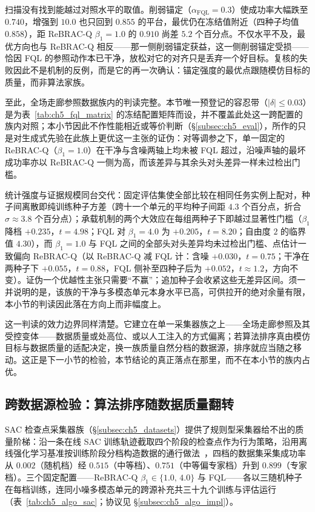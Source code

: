 扫描没有找到能越过对照水平的取值。削弱锚定（$\alpha_{\mathrm{FQL}}=0.3$）使成功率大幅跌至 $0.740$，增强到 $10.0$ 也只回到 $0.855$ 的平台，最优仍在冻结值附近（四种子均值 $0.858$），距 ReBRAC-Q $\beta_1=1.0$ 的 $0.910$ 尚差 $5.2$ 个百分点。不仅水平不及，最优方向也与 ReBRAC-Q 相反——那一侧削弱锚定获益，这一侧削弱锚定受损——恰因 FQL 的参照动作本已干净，放松对它的对齐只是丢弃一个好目标。复核的失败因此不是机制的反例，而是它的再一次确认：锚定强度的最优点跟随模仿目标的质量，而非算法家族。

至此，全场走廊参照数据族内的判读完整。本节唯一预登记的容忍带（$|\delta|\le 0.03$）是为表~\ref{tab:ch5_fql_matrix} 的冻结配置矩阵而设，并不覆盖此处这一跨配置的族内对照；本小节因此不作性能相近或等价判断（\S\ref{subsec:ch5_eval}），所作的只是对生成式先验在此族上更优这一主张的证伪：对等调参之下，单一固定的 ReBRAC-Q（$\beta_1=1.0$）在干净与含噪两轴上均未被 FQL 超过，沿噪声轴的最坏成功率亦以 ReBRAC-Q 一侧为高，而该差异与其余头对头差异一样未过检出门槛。

统计强度与证据规模同台交代：固定评估集使全部比较在相同任务实例上配对，种子间离散即纯训练种子方差（跨十一个单元的平均种子间距 $4.3$ 个百分点，折合 $\sigma\approx3.8$ 个百分点）；承载机制的两个大效应在每组两种子下即越过显著性门槛（$\beta_1$ 降档 $+0.235$，$t=4.98$；FQL 对 $\beta_1=4.0$ 为 $+0.205$，$t=8.20$；自由度 $2$ 的临界值 $4.30$），而 $\beta_1=1.0$ 与 FQL 之间的全部头对头差异均未过检出门槛、点估计一致偏向 ReBRAC-Q（以 ReBRAC-Q 减 FQL 计：含噪 $+0.030$，$t=0.75$；干净在两种子下 $+0.055$，$t=0.88$，FQL 侧补至四种子后为 $+0.052$，$t\approx1.2$，方向不变）。证伪一个优越性主张只需要“不赢”；追加种子会收紧这些无差异区间。须一并说明的是，该族的干净与多模态单元本身水平已高，可供拉开的绝对余量有限，本小节的判读因此落在方向上而非幅度上。

这一判读的效力边界同样清楚。它建立在单一采集器族之上——全场走廊参照及其受控变体——数据质量或处高位、或以人工注入的方式偏离；若算法排序真由模仿目标与数据质量的适配决定，换一族质量自然分档的数据源，排序就应当随之移动。这正是下一小节的检验，本节结论的真正落点在那里，而不在本小节的族内占优。

\subsection{跨数据源检验：算法排序随数据质量翻转}\label{subsec:ch5_algo_crosssource}

SAC 检查点采集器族（\S\ref{subsec:ch5_datasets}）提供了规则型采集器给不出的质量阶梯：沿一条在线 SAC 训练轨迹截取四个阶段的检查点作为行为策略，沿用离线强化学习基准按训练阶段分档构造数据的通行做法~\citep{fu2020d4rl}，四档的数据集采集成功率从 $0.002$（随机档）经 $0.515$（中等档）、$0.751$（中等偏专家档）升到 $0.899$（专家档）。三个固定配置——ReBRAC-Q $\beta_1\in\{1.0,\,4.0\}$ 与 FQL——各以三随机种子在每档训练，连同小噪多模态单元的跨源补充共三十九个训练与评估运行（表~\ref{tab:ch5_algo_sac}；协议见 \S\ref{subsec:ch5_algo_impl}）。

